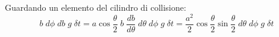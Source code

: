 Guardando un elemento del cilindro di collisione:
\begin{equation}
    b \; d \phi \; db \; g \; \delta t = a \cos \frac{ \theta}{2}  \; b \; \frac{db}{d \theta } \; d\theta \; d \phi \; g \; \delta t = \frac{ a^2}{2} \cos \frac{ \theta}{2} \sin \frac{ \theta}{2} \; d\theta \; d \phi \; g \; \delta t
    \label{eq:collision_cylinder_element}
\end{equation}